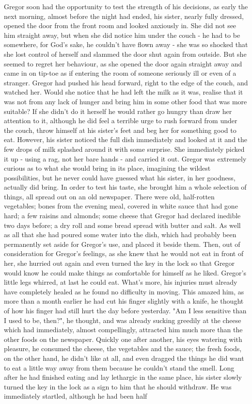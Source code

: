 Gregor soon had the opportunity to test the strength of his decisions, as early the next morning, almost before the night had ended, his sister, nearly fully dressed, opened the door from the front room and looked anxiously in. She did not see him straight away, but when she did notice him under the couch - he had to be somewhere, for God's sake, he couldn't have flown away - she was so shocked that she lost control of herself and slammed the door shut again from outside. But she seemed to regret her behaviour, as she opened the door again straight away and came in on tip-toe as if entering the room of someone seriously ill or even of a stranger. Gregor had pushed his head forward, right to the edge of the couch, and watched her. Would she notice that he had left the milk as it was, realise that it was not from any lack of hunger and bring him in some other food that was more suitable? If she didn't do it herself he would rather go hungry than draw her attention to it, although he did feel a terrible urge to rush forward from under the couch, throw himself at his sister's feet and beg her for something good to eat. However, his sister noticed the full dish immediately and looked at it and the few drops of milk splashed around it with some surprise. She immediately picked it up - using a rag, not her bare hands - and carried it out. Gregor was extremely curious as to what she would bring in its place, imagining the wildest possibilities, but he never could have guessed what his sister, in her goodness, actually did bring. In order to test his taste, she brought him a whole selection of things, all spread out on an old newspaper. There were old, half-rotten vegetables; bones from the evening meal, covered in white sauce that had gone hard; a few raisins and almonds; some cheese that Gregor had declared inedible two days before; a dry roll and some bread spread with butter and salt. As well as all that she had poured some water into the dish, which had probably been permanently set aside for Gregor's use, and placed it beside them. Then, out of consideration for Gregor's feelings, as she knew that he would not eat in front of her, she hurried out again and even turned the key in the lock so that Gregor would know he could make things as comfortable for himself as he liked. Gregor's little legs whirred, at last he could eat. What's more, his injuries must already have completely healed as he found no difficulty in moving. This amazed him, as more than a month earlier he had cut his finger slightly with a knife, he thought of how his finger had still hurt the day before yesterday. "Am I less sensitive than I used to be, then?", he thought, and was already sucking greedily at the cheese which had immediately, almost compellingly, attracted him much more than the other foods on the newspaper. Quickly one after another, his eyes watering with pleasure, he consumed the cheese, the vegetables and the sauce; the fresh foods, on the other hand, he didn't like at all, and even dragged the things he did want to eat a little way away from them because he couldn't stand the smell. Long after he had finished eating and lay lethargic in the same place, his sister slowly turned the key in the lock as a sign to him that he should withdraw. He was immediately startled, although he had been half 